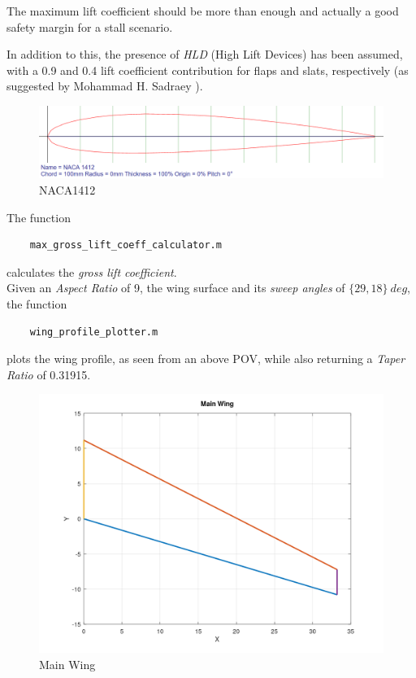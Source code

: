 \documentclass{article}
\begin{document}
The maximum lift coefficient should be more than enough and actually a good safety margin 
for a stall scenario.

In addition to this, the presence of \textit{HLD} (High Lift Devices) has been assumed, with 
a 0.9 and 0.4 lift coefficient contribution for flaps and slats, respectively (as suggested by Mohammad H. Sadraey \autocite{Sadraey_Mohammad}).\\ 

\begin{figure}[h!]
    \centering
    \includegraphics[width=\textwidth]{Sources/Plots_and_Pictures/NACA1412.png}
    \caption{NACA1412}
    \label{NACA1412}
\end{figure}
\clearpage

The function \autocite{Airbus_replacement_repo} 
\begin{verbatim}
    max_gross_lift_coeff_calculator.m
\end{verbatim}
calculates the \textit{gross lift coefficient}.\\

Given an \textit{Aspect Ratio} of 9, the wing surface and its \textit{sweep angles} of $ \{29, 18 \} \ deg$,
the function 
\begin{verbatim}
    wing_profile_plotter.m
\end{verbatim}
plots the wing profile, as seen from an above POV, while also returning a \textit{Taper Ratio} of 0.31915.\\ 

\begin{figure}[h!]
    \centering
    \includegraphics[width=\textwidth]{Sources/Plots_and_Pictures/Main_Wing.png}
    \caption{Main Wing}
    \label{Main_wing}
\end{figure}
\end{document}
